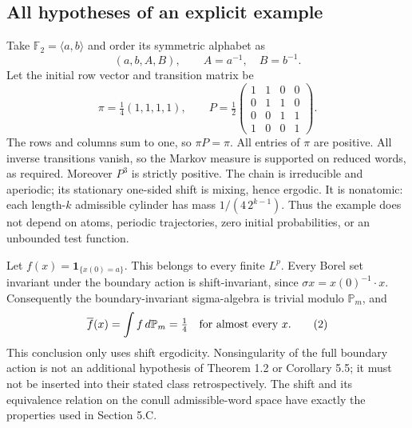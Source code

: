 \documentclass[10pt]{article}
\begin{document}
\subsection*{All hypotheses of an explicit example}
Take \(\mathbb F_2=\langle a,b\rangle\) and order its symmetric alphabet as \[(a,b,A,B),\qquad A=a^{-1},\quad B=b^{-1}.\] Let the initial row vector and transition matrix be \[\pi=\tfrac14(1,1,1,1),\qquad
 P=\tfrac12\begin{pmatrix}
 1&1&0&0\\
 0&1&1&0\\
 0&0&1&1\\
 1&0&0&1
 \end{pmatrix}.
 \tag{1}\] The rows and columns sum to one, so \(\pi P=\pi\). All entries of \(\pi\) are positive. All inverse transitions vanish, so the Markov measure is supported on reduced words, as required. Moreover \(P^3\) is strictly positive. The chain is irreducible and aperiodic; its stationary one-sided shift is mixing, hence ergodic. It is nonatomic: each length-\(k\) admissible cylinder has mass \(1/(4\,2^{k-1})\). Thus the example does not depend on atoms, periodic trajectories, zero initial probabilities, or an unbounded test function.\par
Let \(f(x)=\mathbf1_{\{x(0)=a\}}\). This belongs to every finite \(L^p\). Every Borel set invariant under the boundary action is shift-invariant, since \(\sigma x=x(0)^{-1}\cdot x\). Consequently the boundary-invariant sigma-algebra is trivial modulo \(\mathbb P_m\), and \[\overline f(x)=\int f\,d\mathbb P_m=\tfrac14
 \quad\hbox{for almost every }x.
 \tag{2}\] This conclusion only uses shift ergodicity. Nonsingularity of the full boundary action is not an additional hypothesis of Theorem 1.2 or Corollary 5.5; it must not be inserted into their stated class retrospectively. The shift and its equivalence relation on the conull admissible-word space have exactly the properties used in Section 5.C.\par
\end{document}
